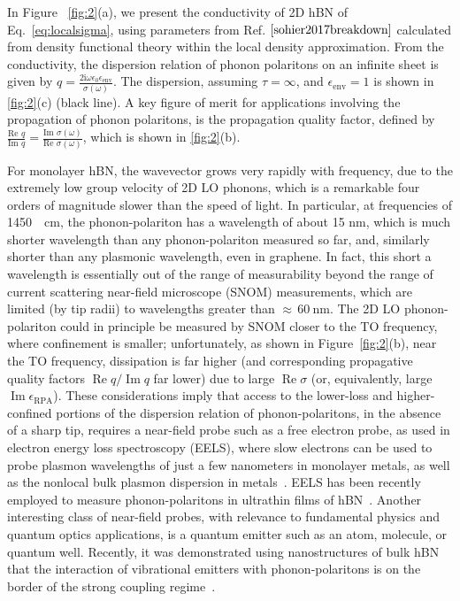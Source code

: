 \documentclass[aps,prb,twocolumn,
	           groupedaddress,superscriptaddress,
               amsfonts,amssymb,amsmath,floatfix,
	           citeautoscript]{revtex4-1}
\renewcommand{\Im}{\operatorname{Im}}
\renewcommand{\Re}{\operatorname{Re}}
\newcommand{\iu}{\mathrm{i}}
\newcommand{\comment}[2]{%
    \ifbool{togglecomments}%
    {\textcolor{blue!70!black}{\small\textsf{%
    \textsuperscript{\textsc{\textsf{\MakeLowercase{#1}}}}%
    [#2]}}} %
    {}}     %
\begin{document}
In Figure ~\ref{fig:2}(a), we present the conductivity of 2D hBN of Eq.~\ref{eq:localsigma}, using parameters from Ref. $\cite{sohier2017breakdown}$ calculated from density functional theory within the local density approximation. From the conductivity, the dispersion relation of phonon polaritons on an infinite sheet is given by $q=\frac{2\iu\omega\epsilon_0\epsilon_{\mathrm{env}}}{\sigma(\omega)}$. The dispersion, assuming $\tau = \infty$, and $\epsilon_{\mathrm{env}}=1$ is shown in \ref{fig:2}(c) (black line). A key figure of merit for applications involving the propagation of phonon polaritons, is the propagation quality factor, defined by $\frac{\text{Re }q}{\text{Im }q} = \frac{\text{Im }\sigma(\omega)}{\text{Re }\sigma(\omega)}$, which is shown in \ref{fig:2}(b).

For monolayer hBN, the wavevector grows very rapidly with frequency, due to the extremely low group velocity of 2D LO phonons, which is a remarkable four orders of magnitude slower than the speed of light.  In particular, at frequencies of \SI{1450}{\per\cm}, the phonon-polariton has a wavelength of about 15 nm, which is much shorter wavelength than any phonon-polariton measured so far, and, similarly shorter than any plasmonic wavelength, even in graphene. In fact, this short a wavelength is essentially out of the range of measurability beyond the range of current scattering near-field microscope (SNOM) measurements, which are limited (by tip radii) to wavelengths greater than $\approx\,\SI{60}{\nm}$. The 2D LO phonon-polariton could in principle be measured by SNOM closer to the TO frequency, where confinement is smaller; unfortunately, as shown in Figure~\ref{fig:2}(b), near the TO frequency, dissipation is far higher (and corresponding propagative quality factors $\Re q/\Im q$ far lower) due to large $\Re\sigma$ (or, equivalently, large $\Im\epsilon_{\mathrm{RPA}}$).
These considerations imply that access to the lower-loss and higher-confined portions of the dispersion relation of phonon-polaritons, in the absence of a sharp tip, requires a near-field probe such as a free electron probe, as used in electron energy loss spectroscopy (EELS),  where slow electrons can be used to probe plasmon wavelengths of just a few nanometers in monolayer metals, as well as the nonlocal bulk plasmon dispersion in metals~\cite{nagao2001dispersion,de2010optical,diaconescu2007low}.
EELS has been recently employed to measure phonon-polaritons in ultrathin films of hBN~\cite{govyadinov2017probing}. Another interesting class of near-field probes, with relevance to fundamental physics and quantum optics applications, is a quantum emitter such as an atom, molecule, or quantum well. Recently, it was demonstrated using nanostructures of bulk hBN that the interaction of vibrational emitters with phonon-polaritons is on the border of the strong coupling regime~\cite{autore2018boron}.
\end{document}
